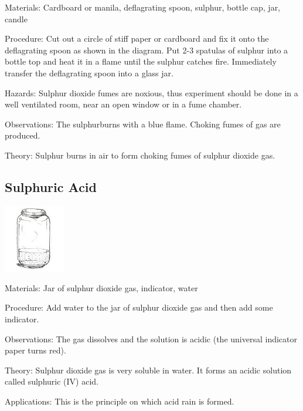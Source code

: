 \begin{multicols}{2}
\begin{description*}
\item[Materials:]{Cardboard or manila, deflagrating spoon, sulphur, bottle cap, jar, candle}
\item[Procedure:]{Cut out a circle of stiff paper or cardboard and
fix it onto the deflagrating spoon as shown in the
diagram. Put 2-3 spatulas of sulphur into a bottle
top and heat it in a flame until the sulphur
catches fire. Immediately transfer the
deflagrating spoon into a glass jar.}
\item[Hazards:]{Sulphur dioxide fumes are noxious, thus
experiment should be done in a well ventilated
room, near an open window or in a fume
chamber.}
\item[Observations:]{The sulphurburns with a blue flame. Choking
fumes of gas are produced.}
\item[Theory:]{Sulphur burns in air to form choking fumes
of sulphur dioxide gas.}
\end{description*}

\subsection{Sulphuric Acid}

\begin{center}
\includegraphics[width=0.2\textwidth]{./img/source/sulphuric-acid.jpg}
\end{center}

\begin{description*}
\item[Materials:]{Jar of sulphur dioxide gas, indicator, water}
\item[Procedure:]{Add water to the jar of sulphur dioxide gas and
then add some indicator.}
\item[Observations:]{The gas dissolves and the solution is acidic
(the universal indicator paper turns red).}
\item[Theory:]{Sulphur dioxide gas is very soluble in water.
It forms an acidic solution called sulphuric (IV)
acid. }
\item[Applications:]{This is the principle on which acid rain is
formed.}
\end{description*}


\end{multicols}
